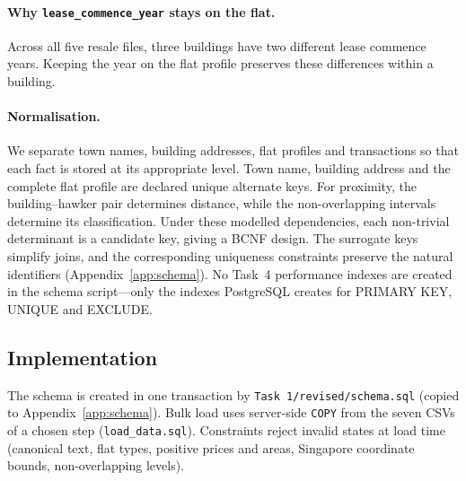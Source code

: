 \paragraph{Why \texttt{lease\_commence\_year} stays on the flat.}
Across all five resale files, three buildings have two different lease commence years.
Keeping the year on the flat profile preserves these differences within a building.

\paragraph{Normalisation.}
We separate town names, building addresses, flat profiles and transactions so that each fact is stored at its appropriate level.
Town name, building address and the complete flat profile are declared unique alternate keys.
For proximity, the building--hawker pair determines distance, while the non-overlapping intervals determine its classification.
Under these modelled dependencies, each non-trivial determinant is a candidate key, giving a BCNF design.
The surrogate keys simplify joins, and the corresponding uniqueness constraints preserve the natural identifiers (Appendix~\ref{app:schema}).
No Task~4 performance indexes are created in the schema script---only the indexes PostgreSQL creates for PRIMARY KEY, UNIQUE and EXCLUDE.

\subsection{Implementation}
The schema is created in one transaction by \texttt{Task 1/revised/schema.sql} (copied to Appendix~\ref{app:schema}).
Bulk load uses server-side \texttt{COPY} from the seven CSVs of a chosen step (\texttt{load\_data.sql}).
Constraints reject invalid states at load time (canonical text, flat types, positive prices and areas, Singapore coordinate bounds, non-overlapping levels).

